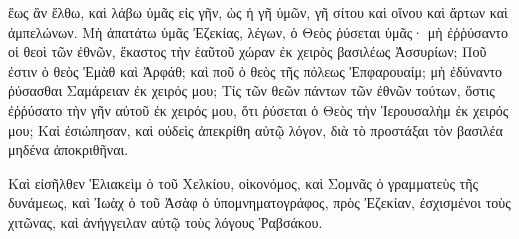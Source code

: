 {ἕως ἂν ἔλθω, καὶ λάβω ὑμᾶς εἰς γῆν, ὡς ἡ γῆ ὑμῶν, γῆ σίτου καὶ οἴνου καὶ ἄρτων καὶ ἀμπελώνων.
Μὴ ἀπατάτω ὑμᾶς Ἐζεκίας, λέγων, ὁ Θεὸς ῥύσεται ὑμᾶς· μὴ ἐῤῥύσαντο οἱ θεοὶ τῶν ἐθνῶν, ἕκαστος τὴν ἑαῦτοῦ χώραν ἐκ χειρὸς βασιλέως Ἀσσυρίων;
Ποῦ ἐστιν ὁ θεὸς Ἐμὰθ καὶ Ἀρφάθ; καὶ ποῦ ὁ θεὸς τῆς πόλεως Ἐπφαρουαίμ; μὴ ἐδύναντο ῥύσασθαι Σαμάρειαν ἐκ χειρός μου;
Τίς τῶν θεῶν πάντων τῶν ἐθνῶν τούτων, ὅστις ἐῤῥύσατο τὴν γῆν αὐτοῦ ἐκ χειρός μου, ὅτι ῥύσεται ὁ Θεὸς τὴν Ἱερουσαλὴμ ἐκ χειρός μου;
Καὶ ἐσιώπησαν, καὶ οὐδεὶς ἀπεκρίθη αὐτῷ λόγον, διὰ τὸ προστάξαι τὸν βασιλέα μηδένα ἀποκριθῆναι.
\par }{\PP {}Καὶ εἰσῆλθεν Ἑλιακεὶμ ὁ τοῦ Χελκίου, οἰκονόμος, καὶ Σομνᾶς ὁ γραμματεὺς τῆς δυνάμεως, καὶ Ἰωὰχ ὁ τοῦ Ἀσὰφ ὁ ὑπομνηματογράφος, πρὸς Ἐζεκίαν, ἐσχισμένοι τοὺς χιτῶνας, καὶ ἀνήγγειλαν αὐτῷ τοὺς λόγους Ῥαβσάκου.

}

